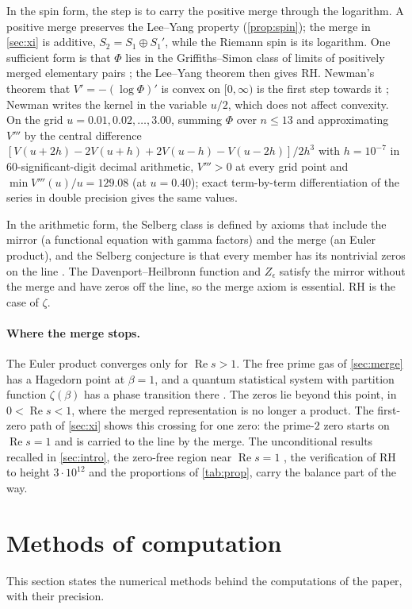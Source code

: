 \documentclass[11pt]{article}
\theoremstyle{definition}\newtheorem{definition}[theorem]{Definition}
\theoremstyle{remark}\newtheorem{remark}[theorem]{Remark}
\renewcommand{\Re}{\operatorname{Re}}\renewcommand{\Im}{\operatorname{Im}}
\begin{document}
In the spin form, the step is to carry the positive merge through the logarithm. A positive merge preserves the Lee--Yang property (\cref{prop:spin}); the merge in \cref{sec:xi} is additive, $S_2=S_1\oplus S_1'$, while the Riemann spin is its logarithm. One sufficient form is that $\Phi$ lies in the Griffiths--Simon class of limits of positively merged elementary pairs \cite{SimonGriffiths}; the Lee--Yang theorem then gives RH. Newman's theorem that $V'=-(\log\Phi)'$ is convex on $[0,\infty)$ is the first step towards it \cite{Newman91}; Newman writes the kernel in the variable $u/2$, which does not affect convexity. On the grid $u=0.01,0.02,\dots,3.00$, summing $\Phi$ over $n\le13$ and approximating $V'''$ by the central difference $[V(u+2h)-2V(u+h)+2V(u-h)-V(u-2h)]/2h^3$ with $h=10^{-7}$ in $60$-significant-digit decimal arithmetic, $V'''>0$ at every grid point and $\min V'''(u)/u=129.08$ (at $u=0.40$); exact term-by-term differentiation of the series in double precision gives the same values.

In the arithmetic form, the Selberg class is defined by axioms that include the mirror (a functional equation with gamma factors) and the merge (an Euler product), and the Selberg conjecture is that every member has its nontrivial zeros on the line \cite{Selberg}. The Davenport--Heilbronn function and $Z_\epsilon$ satisfy the mirror without the merge and have zeros off the line, so the merge axiom is essential. RH is the case of $\zeta$.

\paragraph{Where the merge stops.} The Euler product converges only for $\Re s>1$. The free prime gas of \cref{sec:merge} has a Hagedorn point at $\beta=1$, and a quantum statistical system with partition function $\zeta(\beta)$ has a phase transition there \cite{BostConnes}. The zeros lie beyond this point, in $0<\Re s<1$, where the merged representation is no longer a product. The first-zero path of \cref{sec:xi} shows this crossing for one zero: the prime-$2$ zero starts on $\Re s=1$ and is carried to the line by the merge. The unconditional results recalled in \cref{sec:intro}, the zero-free region near $\Re s=1$ \cite{MT}, the verification of RH to height $3\cdot10^{12}$ \cite{PT} and the proportions of \cref{tab:prop}, carry the balance part of the way.

\section{Methods of computation}\label{sec:methods}
This section states the numerical methods behind the computations of the paper, with their precision.
\end{document}
